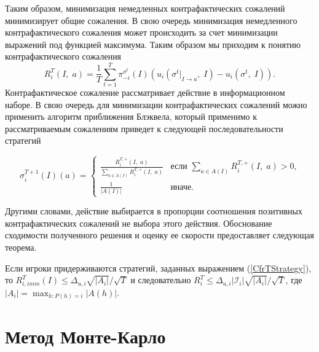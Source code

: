 Таким образом, минимизация немедленных контрафактических сожалений минимизирует общие сожаления. В свою очередь минимизация немедленного контрафактического сожаления может происходить за счет минимизации выражений под функцией максимума. Таким образом мы приходим к понятию контрафактического сожаления 
\begin{equation}
	R_i^T(I,\; a) = \frac{1}{T}\sum_{t=1}^{T}\pi_{-i}^{\sigma^t}(I)(u_i(\sigma^t |_{I \to a},\;I)-u_i(\sigma^t,\;I)).
\end{equation}
Контрафактическое сожаление рассматривает действие в информационном наборе. В свою очередь для минимизации контрафактических сожалений можно применить алгоритм приближения Блэквела, который применимо к рассматриваемым сожалениям приведет к следующей последовательности стратегий 

\begin{equation}\label{CfrTStrategy}
	\sigma_i^{T+1}(I)(a)= 
	\begin{cases}
		\frac{R_i^{T,+}(I,\;a)}{\sum_{a\in A(I)}R_i^{T,+}(I,\;a)} &\text{если $\sum_{a\in A(I)}R_i^{T,+}(I,\;a) > 0$,}\\
		\frac{1}{|A(I)|} &\text{иначе.}
	\end{cases}
\end{equation}

Другими словами, действие выбирается в пропорции соотношения позитивных контрафактических сожалений не выбора этого действия. Обоснование сходимости полученного решения и оценку ее скорости предоставляет следующая теорема. 

\begin{theo}
	Если игроки придерживаются стратегий, заданных выражением (\ref{CfrTStrategy}), то $R_{i,imm}^T(I) \leq \Delta_{u,i}\sqrt{|A_i|}/\sqrt{T}$ и следовательно $R_i^T \leq \Delta_{u,i}|\mathcal{I}_i|\sqrt{|A_i|}/\sqrt{T}$, где $|A_i|=\max_{h\colon P(h)=i}|A(h)|$.
\end{theo}

\section{Метод Монте-Карло}